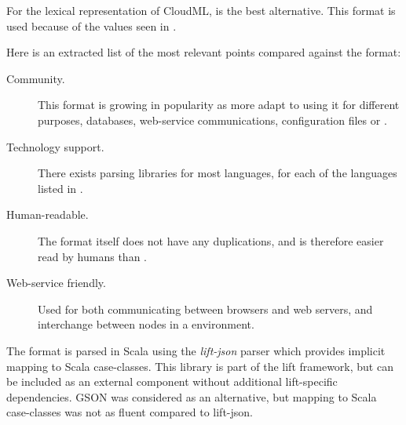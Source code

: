 For the lexical representation of CloudML,  is the best alternative.
This format is used because of the values seen in .

Here is an extracted list of the most relevant points compared against the  format:
\begin{description}
  \item[Community.] This format is growing in popularity as more adapt to using it for
    different purposes, \eg databases, web-service communications, configuration files or .
  \item[Technology support.]
    There exists parsing libraries for most languages,
    for each of the languages listed in .
  \item[Human-readable.]
    The format itself does not have any duplications, and is therefore easier read by humans
    than .
  \item[Web-service friendly.]
    Used for both communicating between browsers and web servers, 
    and interchange between nodes in a  environment.
\end{description}

The  format is parsed in Scala using the \emph{lift-json} parser which provides implicit
mapping to Scala case-classes. This library is part of the lift framework,
but can be included as an external component without additional lift-specific dependencies.
GSON was considered as an alternative, but mapping to Scala case-classes was not as 
fluent compared to lift-json.

